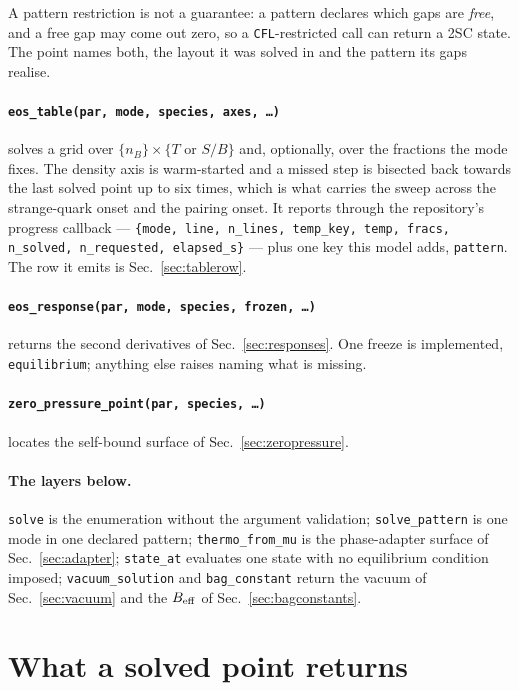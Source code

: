 \documentclass[aps,prc,onecolumn,superscriptaddress,nofootinbib,10pt]{revtex4-2}
\newcommand{\nB}{n_B}
\begin{document}
A pattern restriction is not a guarantee: a pattern declares which gaps are
\emph{free}, and a free gap may come out zero, so a \texttt{CFL}-restricted
call can return a 2SC state. The point names both, the layout it was solved in
and the pattern its gaps realise.

\paragraph{\texttt{eos\_table(par, mode, species, axes, \dots)}} solves a grid
over $\{\nB\}\times\{T$ or $S/B\}$ and, optionally, over the fractions the mode
fixes. The density axis is warm-started and a missed step is bisected back
towards the last solved point up to six times, which is what carries the sweep
across the strange-quark onset and the pairing onset. It reports through the
repository's progress callback --- \texttt{\{mode, line, n\_lines, temp\_key,
temp, fracs, n\_solved, n\_requested, elapsed\_s\}} --- plus one key this model
adds, \texttt{pattern}. The row it emits is Sec.~\ref{sec:tablerow}.

\paragraph{\texttt{eos\_response(par, mode, species, frozen, \dots)}} returns
the second derivatives of Sec.~\ref{sec:responses}. One freeze is implemented,
\texttt{equilibrium}; anything else raises naming what is missing.

\paragraph{\texttt{zero\_pressure\_point(par, species, \dots)}} locates the
self-bound surface of Sec.~\ref{sec:zeropressure}.

\paragraph{The layers below.} \texttt{solve} is the enumeration without the
argument validation; \texttt{solve\_pattern} is one mode in one declared
pattern; \texttt{thermo\_from\_mu} is the phase-adapter surface of
Sec.~\ref{sec:adapter}; \texttt{state\_at} evaluates one state with no
equilibrium condition imposed; \texttt{vacuum\_solution} and
\texttt{bag\_constant} return the vacuum of Sec.~\ref{sec:vacuum} and the
$B_{\rm eff}$ of Sec.~\ref{sec:bagconstants}.

\section{What a solved point returns}
\label{sec:returns}
\end{document}

